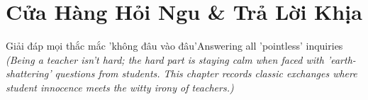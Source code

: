 \chapter{Cửa Hàng Hỏi Ngu \& Trả Lời Khịa}

\begin{truyen}{Giải đáp mọi thắc mắc 'không đâu vào đâu'}{Answering all 'pointless' inquiries}
\textit{\color{v3teal}(Being a teacher isn't hard; the hard part is staying calm when faced with 'earth-shattering' questions from students. This chapter records classic exchanges where student innocence meets the witty irony of teachers.)}
\end{truyen}

